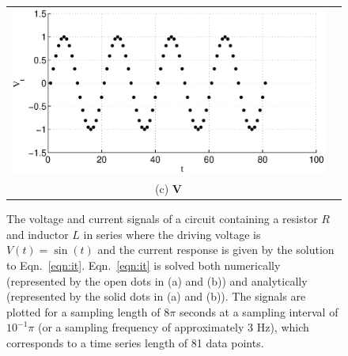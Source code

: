 {\begin{center}
\begin{figure}[h]
\begin{center}
\begin{tabular}{cc}
\includegraphics[scale=0.35]{IRCircuitResponseExampleL10R5_X.eps} \\
(c) $\mathbf{V}$
\end{tabular}
\end{center}
\caption[The voltage and current signals of a circuit]{The voltage and current signals of a circuit containing a resistor $R$ and inductor $L$ in series where the driving voltage is $V(t)=\sin(t)$ and the current response is given by the solution to Eqn.\ \ref{eqn:it}.  Eqn.\ \ref{eqn:it} is solved both numerically (represented by the open dots in (a) and (b)) and analytically (represented by the solid dots in (a) and (b)).  The signals are plotted for a sampling length of $8\pi$ seconds at a sampling interval of $10^{-1}\pi$ (or a sampling frequency of approximately 3 Hz), which corresponds to a time series length of 81 data points.}
\label{fig:VIplot}
\end{figure}
\end{center}
\vspace*{\fill}
}
